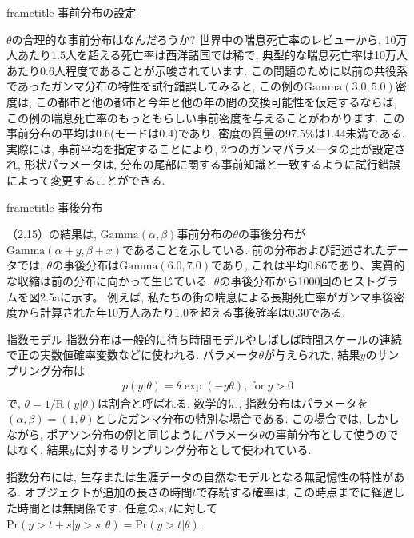 \documentclass[10pt,dvipdfmx,a4]{beamer}
\newcommand{\eqn}[1]{\begin{align*}#1\end{align*}}
\newcommand{\dbox}[1]{\begin{beamercolorbox}[wd=122mm, sep=0pt, shadow=false, rounded=false]{frametitle} { #1}\end{beamercolorbox}}
\begin{document}

\begin{frame}
\dbox{事前分布の設定}
$\theta$の合理的な事前分布はなんだろうか?
世界中の喘息死亡率のレビューから, 10万人あたり1.5人を超える死亡率は西洋諸国では稀で, 典型的な喘息死亡率は10万人あたり0.6人程度であることが示唆されています.
この問題のために以前の共役系であったガンマ分布の特性を試行錯誤してみると, この例の$\text{Gamma}(3.0,5.0)$密度は, この都市と他の都市と今年と他の年の間の交換可能性を仮定するならば, この例の喘息死亡率のもっともらしい事前密度を与えることがわかります.
この事前分布の平均は0.6(モードは0.4)であり, 密度の質量の97.5\%は1.44未満である.
実際には, 事前平均を指定することにより, 2つのガンマパラメータの比が設定され, 形状パラメータは, 分布の尾部に関する事前知識と一致するように試行錯誤によって変更することができる.
\end{frame}


\begin{frame}
\dbox{事後分布}
（2.15）の結果は, $\text{Gamma}(\alpha,\beta)$事前分布の$\theta$の事後分布が$\text{Gamma}(\alpha+y,\beta+x)$であることを示している.
前の分布および記述されたデータでは, $\theta$の事後分布は$\text{Gamma}(6.0,7.0)$であり, これは平均0.86であり、実質的な収縮は前の分布に向かって生じている.
$\theta$の事後分布から1000回のヒストグラムを図2.5aに示す。
例えば, 私たちの街の喘息による長期死亡率がガンマ事後密度から計算された年10万人あたり1.0を超える事後確率は0.30である.
\end{frame}


\begin{frame}{指数モデル}
指数分布は一般的に待ち時間モデルやしばしば時間スケールの連続で正の実数値確率変数などに使われる.
パラメータ$\theta$が与えられた, 結果$y$のサンプリング分布は
\eqn{p(y|\theta)=\theta\exp(-y\theta),\ \text{for}\ y>0}
で, $\theta=1/\text{R}(y|\theta)$は割合と呼ばれる.
数学的に, 指数分布はパラメータを$(\alpha,\beta)=(1,\theta)$としたガンマ分布の特別な場合である.
この場合では, しかしながら, ポアソン分布の例と同じようにパラメータ$\theta$の事前分布として使うのではなく, 結果$y$に対するサンプリング分布として使われている.

指数分布には, 生存または生涯データの自然なモデルとなる無記憶性の特性がある.
オブジェクトが追加の長さの時間$t$で存続する確率は, この時点までに経過した時間とは無関係です.
任意の$s, t$に対して$\text{Pr}(y>t+s|y>s,\theta)=\text{Pr}(y>t|\theta)$.
\end{frame}
\end{document}
